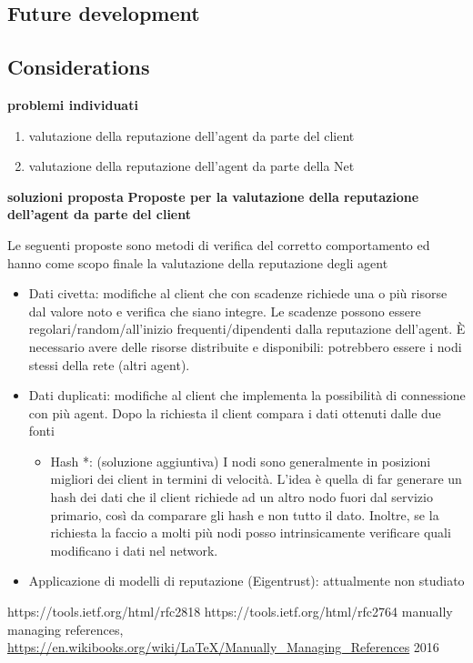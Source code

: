 \documentclass[]{article}
\begin{document}
	\subsection{Future development}
	\subsection{Considerations}

	\pagebreak

	\textbf{problemi individuati}
	\begin{enumerate}
		\item valutazione della reputazione dell'agent da parte del client
		\item valutazione della reputazione dell'agent da parte della Net
	\end{enumerate}
	
	\textbf{soluzioni proposta}
	\textbf{Proposte per la valutazione della reputazione dell'agent da parte del client}
	
	Le seguenti proposte sono metodi di verifica del corretto comportamento ed hanno come scopo finale la valutazione della reputazione degli agent
	\begin{itemize}
		\item Dati civetta: modifiche al client che con scadenze richiede una o più risorse dal valore noto e verifica che siano integre. Le scadenze possono essere regolari/random/all’inizio frequenti/dipendenti dalla reputazione dell’agent. È necessario avere delle risorse distribuite e disponibili: potrebbero essere i nodi stessi della rete (altri agent).
		\item Dati duplicati: modifiche al client che implementa la possibilità di connessione con più agent. Dopo la richiesta il client compara i dati ottenuti dalle due fonti
		\begin{itemize}
			\item Hash *: (soluzione aggiuntiva) I nodi sono generalmente in posizioni migliori dei client in termini di velocità. L’idea è quella di far generare un hash dei dati che il client richiede ad un altro nodo fuori dal servizio primario, così da comparare gli hash e non tutto il dato.
			Inoltre, se la richiesta la faccio a molti più nodi posso intrinsicamente verificare quali modificano i dati nel network.
		\end{itemize}
		\item Applicazione di modelli di reputazione (Eigentrust): attualmente non studiato
	\end{itemize}

	
	\begin{thebibliography}{1}
			https://tools.ietf.org/html/rfc2818
			https://tools.ietf.org/html/rfc2764
			manually managing references, 
			\url{https://en.wikibooks.org/wiki/LaTeX/Manually_Managing_References}
			2016
	\end{thebibliography}
		
	\pagebreak
	
	
\end{document}
